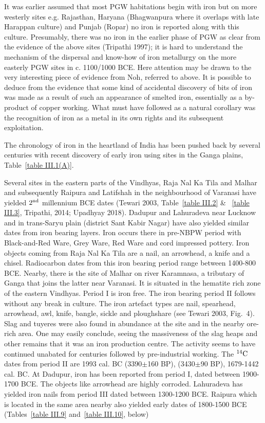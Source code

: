 It was earlier assumed that most PGW habitations begin with iron but on more westerly sites e.g. Rajasthan, Haryana (Bhagwanpura where it overlaps with late Harappan culture) and Punjab (Ropar) no iron is reported along with this culture. Presumably, there was no iron in the earlier phase of PGW as clear from the evidence of the above sites (Tripathi 1997); it is hard to understand the mechanism of the dispersal and know-how of iron metallurgy on the more easterly PGW sites in c. 1100/1000 BCE. Here attention may be drawn to the very interesting piece of evidence from Noh, referred to above. It is possible to deduce from the evidence that some kind of accidental discovery of bits of iron was made as a result of such an appearance of smelted iron, essentially as a by-product of copper working. What must have followed as a natural corollary was the recognition of iron as a metal in its own rights and its subsequent exploitation.

The chronology of iron in the heartland of India has been pushed back by several centuries with recent discovery of early iron using sites in the Ganga plains, Table~\ref{table III.1(A)}.

Several sites in the eastern parts of the Vindhyas, Raja Nal Ka Tila and Malhar and subsequently Raipura and Latifshah in the neighbourhood of  Varanasi have yielded $2^{\rm nd}$ millennium BCE dates (Tewari 2003, Table~\ref{table III.2} \& ~\ref{table III.3}, Tripathi, 2014; Upadhyay 2018). Dadupur and Lahuradeva near Lucknow and in trans-Saryu plain (district Sant Kabir Nagar) have also yielded similar dates from iron bearing layers. Iron occurs there in pre-NBPW period with Black-and-Red Ware, Grey Ware, Red Ware and cord impressed pottery. Iron objects coming from Raja Nal Ka Tila are a nail, an arrowhead, a knife and a chisel. Radiocarbon dates from this iron bearing period range between 1400-800 BCE. Nearby, there is the site of Malhar on river Karamnasa, a tributary of Ganga that joins the latter near Varanasi. It is situated in the hematite rich zone of the eastern Vindhyas. Period I is iron free. The iron bearing period II follows without any break in culture. The iron artefact types are nail, spearhead, arrowhead, awl, knife, bangle, sickle and ploughshare (see Tewari 2003, Fig.~4). Slag and tuyeres were also found in abundance at the site and in the nearby ore-rich area. One may easily conclude, seeing the massiveness of the slag heaps and other remains that it was an iron production centre. The activity seems to have continued unabated for centuries followed by pre-industrial working. The $^{14}{\rm C}$ dates from period II are 1993 cal. BC (3390$\pm$160 BP), (3430$\pm$90 BP), 1679-1442 cal. BC. At Dadupur, iron has been reported from period I, dated between 1900-1700 BCE. The objects like arrowhead are highly corroded. Lahuradeva has yielded iron nails from period III dated between 1300-1200 BCE. Raipura which is located in the same area nearby also yielded early dates of 1800-1500 BCE (Tables~\ref{table III.9} and~\ref{table III.10}, below)

